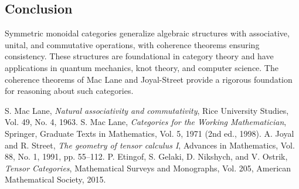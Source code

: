 \documentclass{article}
\theoremstyle{plain}
\theoremstyle{remark}
\begin{document}
\subsection{Conclusion}

Symmetric monoidal categories generalize algebraic structures with associative, unital, and commutative operations, with coherence theorems ensuring consistency. These structures are foundational in category theory and have applications in quantum mechanics, knot theory, and computer science. The coherence theorems of Mac Lane and Joyal-Street provide a rigorous foundation for reasoning about such categories.

\begin{thebibliography}{9}

 S. Mac Lane, \emph{Natural associativity and commutativity}, Rice University Studies, Vol. 49, No. 4, 1963.
 S. Mac Lane, \emph{Categories for the Working Mathematician}, Springer, Graduate Texts in Mathematics, Vol. 5, 1971 (2nd ed., 1998).
 A. Joyal and R. Street, \emph{The geometry of tensor calculus I}, Advances in Mathematics, Vol. 88, No. 1, 1991, pp. 55--112.
 P. Etingof, S. Gelaki, D. Nikshych, and V. Ostrik, \emph{Tensor Categories}, Mathematical Surveys and Monographs, Vol. 205, American Mathematical Society, 2015.

\end{thebibliography}
\end{document}
